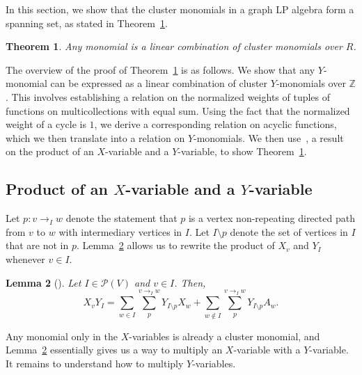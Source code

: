\documentclass[11pt]{article}
\newtheorem{theo}{Theorem}[section]
\newtheorem{lemm}[theo]{Lemma}
\theoremstyle{definition}
\numberwithin{equation}{section}
\newcommand{\integers}{\mathbb{Z}}
\newcommand{\vertices}{V}
\newcommand{\powerset}[1]{\mathcal{P}(#1)}
\newcommand{\coefficientring}{R}
\newcommand{\ppath}[3]{\ensuremath{#1 \to_{#2} #3}}
\begin{document}
In this section, we show that the cluster monomials in a graph LP algebra form a spanning set, as stated in Theorem~\ref{theorem:spanningset}.

\begin{theo} \label{theorem:spanningset}
    Any monomial is a linear combination of cluster monomials over \(\coefficientring\).
\end{theo}

The overview of the proof of Theorem~\ref{theorem:spanningset} is as follows.
We show that any \(Y\)-monomial can be expressed as a linear combination of cluster \(Y\)-monomials over \(\integers\).
This involves establishing a relation on the normalized weights of tuples of functions on multicollections with equal sum.
Using the fact that the normalized weight of a cycle is \(1\),
we derive a corresponding relation on acyclic functions,
which we then translate into a relation on \(Y\)-monomials.
We then use~\cite[Lemma~4.7]{linearLP}, a result on the product of an \(X\)-variable and a \(Y\)-variable, to show Theorem~\ref{theorem:spanningset}.

\subsection{Product of an \texorpdfstring{\(X\)}{X}-variable and a \texorpdfstring{\(Y\)}{Y}-variable} \label{subsection:productXY}

Let \(p \colon \ppath{v}{I}{w}\) denote the statement that \(p\) is a vertex non-repeating directed path from \(v\) to \(w\) with intermediary vertices in \(I\).
Let \(I \setminus p\) denote the set of vertices in \(I\) that are not in \(p\).
Lemma~\ref{lemma:XYgood} allows us to rewrite the product of \(X_v\) and \(Y_I\) whenever \(v \in I\).

\begin{lemm}[{\cite[inferred from Lemma 4.7]{linearLP}}] \label{lemma:XYgood}
Let \(I \in \powerset{\vertices}\) and \(v \in I\).
Then,
\begin{equation*} \label{ppathsequation}
    X_v Y_I =
    \sum_{w \in I}
    \sum_{p}^{\ppath{v}{I}{w}}
    Y_{I \setminus p}  X_w
    +
    \sum_{w \not\in I}
    \sum_{p}^{\ppath{v}{I}{w}}
    Y_{I \setminus p}  A_w.
\end{equation*}
\end{lemm}

Any monomial only in the \(X\)-variables is already a cluster monomial, and Lemma~\ref{lemma:XYgood} essentially gives us a way to multiply an \(X\)-variable with a \(Y\)-variable.
It remains to understand how to multiply \(Y\)-variables. 
\end{document}
